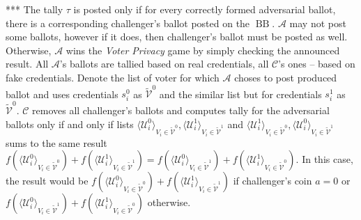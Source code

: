 \documentclass[12pt]{article}
\DeclareMathOperator{\bb}{BB}
\begin{document}
*** The tally $\tau$ is posted only if for every correctly formed adversarial ballot, there is a corresponding challenger's ballot posted on the $\bb$. $\mathcal{A}$ may not post some ballots, however if it does, then challenger's ballot must be posted as well. Otherwise, $\mathcal{A}$ wins the \textit{Voter Privacy} game by simply checking the announced result.  All $\mathcal{A}$'s ballots are tallied based on real credentials, all  $\mathcal{C}$'s ones -- based on fake credentials. Denote the list of  voter for which $\mathcal{A}$ choses to post produced ballot and uses credentials $s_i^0$  as $ \tilde{\mathcal{V}}^0$ and the similar list but for credentials $s_i^1$ as $ \tilde{\mathcal{V}}^0$.   $\mathcal{C}$ removes all challenger's ballots and computes tally for the adversarial ballots only if and only if  lists $\langle \mathcal{U}^0_i \rangle _{V_i \in \tilde{\mathcal{V}}^0}, \langle \mathcal{U}^1_i \rangle _{V_i \in \tilde{\mathcal{V}}^1}$ and $\langle \mathcal{U}^1_i \rangle _{V_i \in \tilde{\mathcal{V}}^0}, \langle \mathcal{U}^0_i \rangle _{V_i \in \tilde{\mathcal{V}}^1}$ sums to the same result $f(\langle \mathcal{U}^0_i \rangle _{V_i \in \tilde{\mathcal{V}}^0} ) + f(\langle \mathcal{U}^1_i \rangle _{V_i \in \tilde{\mathcal{V}}^1} ) =  f(\langle \mathcal{U}^0_i \rangle _{V_i \in \tilde{\mathcal{V}}^1} ) +  f(\langle \mathcal{U}^1_i \rangle _{V_i \in \tilde{\mathcal{V}}^0} )$. In this case, the result would be $f(\langle \mathcal{U}^0_i \rangle _{V_i \in \tilde{\mathcal{V}}^0} ) + f(\langle \mathcal{U}^1_i \rangle _{V_i \in \tilde{\mathcal{V}}^1} )$ if challenger's coin $a=0$ or  $f(\langle \mathcal{U}^0_i \rangle _{V_i \in \tilde{\mathcal{V}}^1} ) +  f(\langle \mathcal{U}^1_i \rangle _{V_i \in \tilde{\mathcal{V}}^0} )$ otherwise.\\
\end{document}
